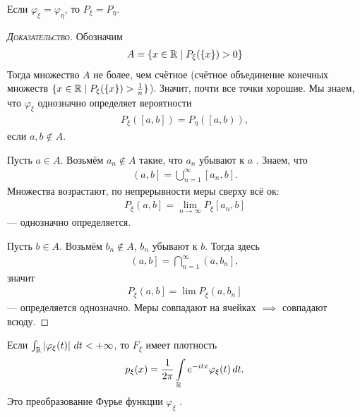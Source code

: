\documentclass[../main.tex]{subfiles}
\begin{document}
\begin{crly}
 Если $ \varphi_\xi = \varphi_\eta $, то $ P_\xi = P_\eta $.
\end{crly}
\begin{proof}[\normalfont\textsc{Доказательство}]
 Обозначим
 \begin{align*}
 A = \left\{ x \in \mathbb{R} \;\middle|\; P_\xi(\left\{ x \right\}) > 0 \right\}
\end{align*} Тогда множество $ A $ не более, чем счётное (счётное объединение конечных множеств $\{x \in \mathbb{R} \mid P_{\xi}(\{x\}) > \frac{1}{n}\}$). Значит, почти все точки хорошие. Мы знаем, что $ \varphi_\xi $ однозначно определяет вероятности
 \begin{align*}
  P_\xi([a,b]) = P_\eta( \left[a, b\right)),
 \end{align*} если $ a,b \notin A $.

 Пусть $ a \in A $.  Возьмём  $ a_n \notin A $ такие, что  $ a_n $ убывают к  $ a $ . Знаем, что
 \begin{align*}
  \left(a, b\right]  = \bigcup_{n=1}^{\infty}[a_n,b].
 \end{align*} Множества возрастают, по непрерывности меры сверху всё ок:
 \begin{align*}
  P_\xi \left(a, b\right] = \lim_{n \to \infty} P_\xi [a_n,b] 
 \end{align*} --- однозначно определяется.

 Пусть $ b \in A $. Возьмём  $ b_n \notin A $,  $ b_n $ убывают к  $ b $. Тогда здесь
 \begin{align*}
  \left(a, b\right] = \bigcap_{n=1}^{\infty} \left(a, b_n\right] ,
 \end{align*} значит
 \begin{align*}
  P_\xi \left(a, b\right] = \lim P_\xi \left(a, b_n\right]   
 \end{align*} --- определяется однозначно. Меры совпадают на ячейках $  \implies $ совпадают всюду.
 
\end{proof}
\begin{crly}
 Если $ \int_{\mathbb{R}} \left| \varphi_\xi(t) \right|\,dt < +\infty  $, то $ F_\xi $ имеет плотность
 \begin{align*}
  p_\xi(x) = \frac{1}{2\pi} \int\limits_{\mathbb{R}} e^{-itx}\varphi_\xi(t)\,dt. 
 \end{align*} Это преобразование Фурье функции $\varphi_\xi$ .
\end{crly}
\end{document}
